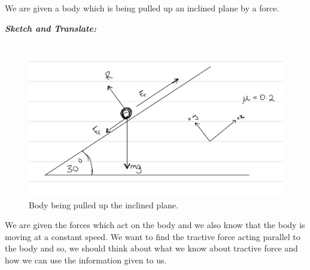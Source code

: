 %
%


\begin{subquestions}
	
\subquestion
We are given a body which is being pulled up an inclined plane by a force.	

\begin{subsubquestions}
	
\subsubquestion
\textbf{\textit{Sketch and Translate:}} \\ \\
\begin{figure} [H]
	\begin{center}
		\includegraphics[scale=0.25]{../2016/figures/2016q6-1}
		\caption{\label{2016:q6:Sketch1} Body being pulled up the inclined plane.}
	\end{center}
\end{figure}
We are given the forces which act on the body and we also know that the body is moving at a constant speed. We want to find the tractive force acting parallel to the body and so, we should think about what we know about tractive force and how we can use the information given to us.	
	

\end{subsubquestions}
\end{subquestions}
